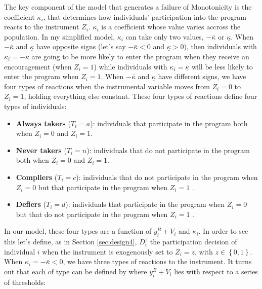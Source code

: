 \documentclass[
]{book}
\providecommand{\tightlist}{%
  \setlength{\itemsep}{0pt}\setlength{\parskip}{0pt}}
\theoremstyle{definition}
\theoremstyle{definition}
\theoremstyle{definition}
\theoremstyle{definition}
\theoremstyle{remark}
\begin{document}
The key component of the model that generates a failure of Monotonicity is the coefficient \(\kappa_i\), that determines how individuals' participation into the program reacts to the instrument \(Z_i\).
\(\kappa_i\) is a coefficient whose value varies accross the population.
In my simplified model, \(\kappa_i\) can take only two values, \(-\bar{\kappa}\) or \(\underline{\kappa}\).
When \(-\bar{\kappa}\) and \(\underline{\kappa}\) have opposite signs (let's say \(-\bar{\kappa}<0\) and \(\underline{\kappa}>0\)), then individuals with \(\kappa_i=-\bar{\kappa}\) are going to be more likely to enter the program when they receive an encouragement (when \(Z_i=1\)) while individuals with \(\kappa_i=\underline{\kappa}\) will be less likely to enter the program when \(Z_i=1\).
When \(-\bar{\kappa}\) and \(\underline{\kappa}\) have different signs, we have four types of reactions when the instrumental variable moves from \(Z_i=0\) to \(Z_i=1\), holding everything else constant.
These four types of reactions define four types of individuals:

\begin{itemize}
\tightlist
\item
  \textbf{Always takers} (\(T_i=a\)): individuals that participate in the program both when \(Z_i=0\) and \(Z_i=1\).
\item
  \textbf{Never takers} (\(T_i=n\)): individuals that do not participate in the program both when \(Z_i=0\) and \(Z_i=1\).
\item
  \textbf{Compliers} (\(T_i=c\)): individuals that do not participate in the program when \(Z_i=0\) but that participate in the program when \(Z_i=1\) .
\item
  \textbf{Defiers} (\(T_i=d\)): individuals that participate in the program when \(Z_i=0\) but that do not participate in the program when \(Z_i=1\) .
\end{itemize}

In our model, these four types are a function of \(y_i^B+V_i\) and \(\kappa_i\).
In order to see this let's define, as in Section \ref{sec:design4}, \(D^z_i\) the participation decision of individual \(i\) when the instrument is exogenously set to \(Z_i=z\), with \(z\in\left\{0,1\right\}\).
When \(\kappa_i=-\bar{\kappa}<0\), we have three types of reactions to the instrument.
It turns out that each of type can be defined by where \(y_i^B+V_i\) lies with respect to a series of thresholds:
\end{document}
